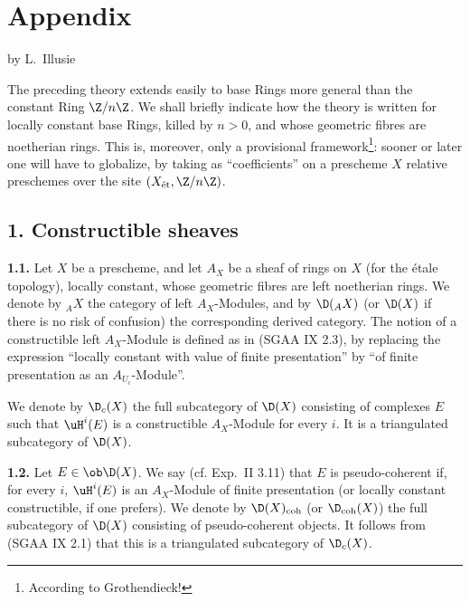 \section*{Appendix}
\begin{center}
by L.~Illusie
\end{center}

The preceding theory extends easily to base Rings more general than the constant Ring $\Z/n\Z$. We shall briefly indicate how the theory is written for locally constant base Rings, killed by $n>0$, and whose geometric fibres are noetherian rings. This is, moreover, only a provisional framework\footnote{According to Grothendieck!}: sooner or later one will have to globalize, by taking as ``coefficients'' on a prescheme $X$ relative preschemes over the site $(X_{\mathrm{\acute et}},\Z/n\Z)$.

\subsection*{1. Constructible sheaves}

\textbf{1.1.} Let $X$ be a prescheme, and let $A_X$ be a sheaf of rings on $X$ (for the étale topology), locally constant, whose geometric fibres are left noetherian rings. We denote by ${}_A X$ the category of left $A_X$-Modules, and by $\D({}_A X)$ (or $\D(X)$ if there is no risk of confusion) the corresponding derived category. The notion of a constructible left $A_X$-Module is defined as in (SGAA IX 2.3), by replacing the expression ``locally constant with value of finite presentation'' by ``of finite presentation as an $A_{U_i}$-Module''.

We denote by $\D_c(X)$ the full subcategory of $\D(X)$ consisting of complexes $E$ such that $\uH^i(E)$ is a constructible $A_X$-Module for every $i$. It is a triangulated subcategory of $\D(X)$.

\textbf{1.2.} Let $E\in\ob\D(X)$. We say (cf. Exp.~II 3.11) that $E$ is pseudo-coherent if, for every $i$, $\uH^i(E)$ is an $A_X$-Module of finite presentation (or locally constant constructible, if one prefers). We denote by $\D(X)_{\mathrm{coh}}$ (or $\D_{\mathrm{coh}}(X)$) the full subcategory of $\D(X)$ consisting of pseudo-coherent objects. It follows from (SGAA IX 2.1) that this is a triangulated subcategory of $\D_c(X)$.

